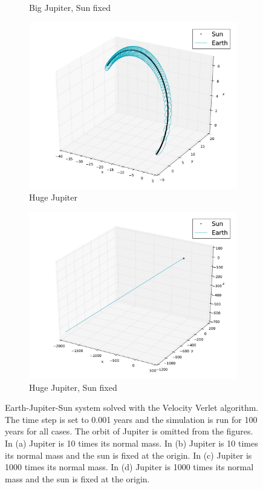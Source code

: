 \documentclass{article}
\begin{document}
\begin{figure}
\begin{subfigure}[b]{0.5\textwidth}
\caption{Big Jupiter, Sun fixed }
\label{subfig:3body_big_fixed}
\end{subfigure}
\begin{subfigure}[b]{0.5\textwidth}
\centering
\includegraphics[width=1\linewidth]{fig/Three_Bodies_Huge_Jupiter_Earth.pdf}
\caption{Huge Jupiter}
\label{subfig:3body_huge}
\end{subfigure}
\begin{subfigure}[b]{0.5\textwidth}
\centering
\includegraphics[width=1\linewidth]{fig/Three_Bodies_Huge_Jupiter_Fixed_Earth.pdf}
\caption{Huge Jupiter, Sun fixed}
\label{subfig:3body_huge_fixed}
\end{subfigure}
\caption{Earth-Jupiter-Sun system solved with the Velocity Verlet algorithm. The time step is set to 0.001 years and the simulation is run for 100 years for all cases. The orbit of Jupiter is omitted from the figures. In (a) Jupiter is 10 times its normal mass. In (b) Jupiter is 10 times its normal mass and the sun is fixed at the origin. In (c) Jupiter is 1000 times its normal mass. In (d) Jupiter is 1000 times its normal mass and the sun is fixed at the origin.}
\label{fig:3body}
\end{figure}
\end{document}
